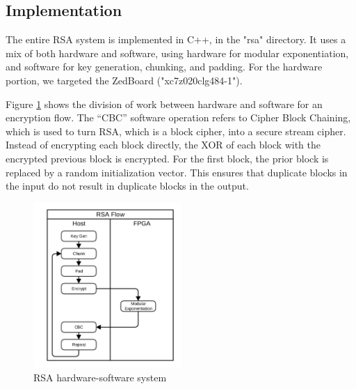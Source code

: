 \subsection{Implementation}
The entire RSA system is implemented in C++, in the "rsa" directory. It uses a mix of both hardware and software, using 
hardware for modular exponentiation, and software for key generation, chunking, and padding. 
For the hardware portion, we targeted the ZedBoard ("xc7z020clg484-1").

Figure \ref{fig:rsaflow} shows the division of work between hardware and software for an encryption flow.
The ``CBC'' software operation refers to Cipher Block Chaining, which is used to turn RSA, which is a block cipher,
into a secure stream cipher. Instead of encrypting each block directly, the XOR of each block with the encrypted previous block
is encrypted. For the first block, the prior block is replaced by a random initialization vector. This ensures that duplicate
blocks in the input do not result in duplicate blocks in the output.

\begin{figure}[h]
\centering
\includegraphics[width=0.5\textwidth]{rsaflow}
\caption{RSA hardware-software system}
\label{fig:rsaflow}
\end{figure}

